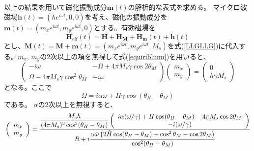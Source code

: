 以上の結果を用いて磁化振動成分$\bm{m}(t)$の解析的な表式を求める。
マイクロ波磁場$\bm{h}(t)=(h e^{i\omega t}, 0, 0)$を考え、磁化の振動成分を$\bm{m}(t)=(m_x e^{i\omega t}, m_y e^{i\omega t}, 0)$とする。有効磁場を
\begin{equation}
\bm{H}_\text{eff}(t)=\bm{H}+\bm{H}_{\bm{M}}+\bm{H}_{\bm{m}}(t)+\bm{h}(t)
\end{equation}
とし、$\bm{M}(t)=\bm{M}+\bm{m}(t)=(m_x e^{i\omega t}, m_y e^{i\omega t}, M_s)$を式(\ref{LLGLLG})に代入する。$m_x$, $m_y$の2次以上の項を無視して式(\ref{equiriblium})を用いると、
\begin{equation}
\left(
\begin{array}{cc}
 -i \omega  & -\Omega+4 \pi M_s  \gamma  \cos 2\theta_M \\
\Omega -4 \pi M_s   \gamma  \cos ^2\theta_M& -i \omega 
\end{array}
\right) 
\left(
\begin{array}{c}
 m_x \\
 m_y
\end{array}
\right) 
=\left(
\begin{array}{c}
 0 \\
 h\gamma M_s
\end{array}
\right) 
\end{equation}
となる。ここで
\begin{equation}
\Omega=i \alpha  \omega +H \gamma  \cos (\theta_H -\theta_M)
\end{equation}
である。
$\alpha$の2次以上を無視すると、
\begin{equation}
{\rm{ }}\left( {\begin{array}{*{20}c}
   {m_x }  \\
  {m_y }  \\
\end{array}} \right) = \frac{{\dfrac{{M_s h }}{{ (4\pi M_s )^2 \cos ^2 (\theta_H  - \theta_M )}}\left( {\begin{array}{*{20}c}
   {i \alpha (\omega/\gamma)  +  {H\cos (\theta_H  - \theta_M ) - 4\pi M_s \cos 2\theta_M } }  \\
   { - i(\omega/\gamma) }  \\
\end{array}} \right)}}{{R + i\dfrac{{\alpha \tilde \omega \left( {2\tilde H\cos (\theta_H  - \theta_M ) - \cos ^2 \theta_M  - \cos 2\theta_M } \right)}}{{\cos ^2 (\theta_H  - \theta_M )}}}}
\end{equation}
